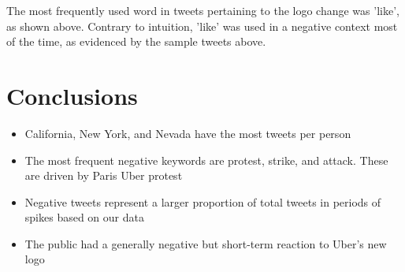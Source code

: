 \documentclass[a222,landscape]{a0poster}
\begin{document}
\begin{multicols}{4}
The most frequently used word in tweets pertaining to the logo change was 'like', as shown above. Contrary to intuition, 'like' was used in a negative context most of the time, as evidenced by the sample tweets above.

\color{DarkRed}

\section*{Conclusions}
\begin{itemize}
\item California, New York, and Nevada have the most tweets per person
\item The most frequent negative keywords are protest, strike, and attack. These are driven by Paris Uber protest
\item Negative tweets represent a larger proportion of total tweets in periods of spikes based on our data
\item The public had a generally negative but short-term reaction to Uber's new logo
\end{itemize}


\color{DarkSlateGray} %







\end{multicols}
\end{document}

